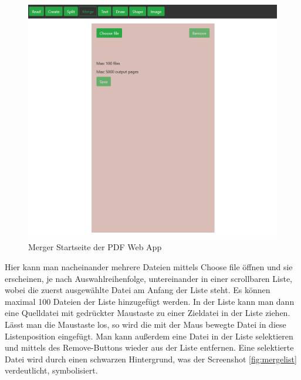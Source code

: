 \begin{figure}[!htbp]
	\centering
	\includegraphics[width=1\textwidth]{"images/merger.png"}
	\caption{Merger Startseite der PDF Web App}
	\label{fig:merger}
\end{figure}

Hier kann man nacheinander mehrere Dateien mittels Choose file öffnen und sie erscheinen, je nach Auswahlreihenfolge, untereinander in einer scrollbaren Liste, wobei die zuerst ausgewählte Datei am Anfang der Liste steht. Es können maximal 100 Dateien der Liste hinzugefügt werden. In der Liste kann man dann eine Quelldatei mit gedrückter Maustaste zu einer Zieldatei in der Liste ziehen. Lässt man die Maustaste los, so wird die mit der Maus bewegte Datei in diese Listenposition eingefügt. Man kann außerdem eine Datei in der Liste selektieren und mittels des Remove-Buttons wieder aus der Liste entfernen. Eine selektierte Datei wird durch einen schwarzen Hintergrund, was der Screenshot \ref{fig:mergelist} verdeutlicht, symbolisiert.

